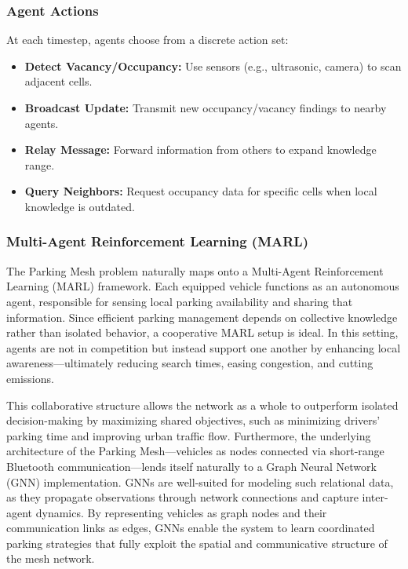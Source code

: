 \subsubsection*{Agent Actions}\leavevmode

At each timestep, agents choose from a discrete action set:
\begin{itemize}
    \item \textbf{Detect Vacancy/Occupancy:} Use sensors (e.g., ultrasonic, camera) to scan adjacent cells.
    \item \textbf{Broadcast Update:} Transmit new occupancy/vacancy findings to nearby agents.
    \item \textbf{Relay Message:} Forward information from others to expand knowledge range.
    \item \textbf{Query Neighbors:} Request occupancy data for specific cells when local knowledge is outdated.
\end{itemize}

\subsubsection*{Multi-Agent Reinforcement Learning (MARL)}\leavevmode

\vspace{0.5em}
The Parking Mesh problem naturally maps onto a Multi-Agent Reinforcement Learning (MARL) framework. Each equipped vehicle functions as an autonomous agent, responsible for sensing local parking availability and sharing that information. Since efficient parking management depends on collective knowledge rather than isolated behavior, a cooperative MARL setup is ideal. In this setting, agents are not in competition but instead support one another by enhancing local awareness—ultimately reducing search times, easing congestion, and cutting emissions.

This collaborative structure allows the network as a whole to outperform isolated decision-making by maximizing shared objectives, such as minimizing drivers' parking time and improving urban traffic flow. Furthermore, the underlying architecture of the Parking Mesh—vehicles as nodes connected via short-range Bluetooth communication—lends itself naturally to a Graph Neural Network (GNN) implementation. GNNs are well-suited for modeling such relational data, as they propagate observations through network connections and capture inter-agent dynamics. By representing vehicles as graph nodes and their communication links as edges, GNNs enable the system to learn coordinated parking strategies that fully exploit the spatial and communicative structure of the mesh network.
